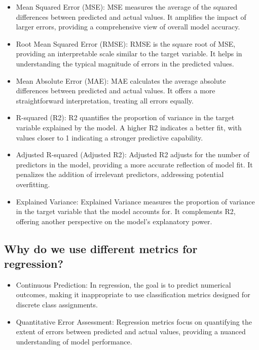 \begin{itemize}
\item Mean Squared Error (MSE):
\newline 
MSE measures the average of the squared differences between predicted and actual values. It amplifies the impact of larger errors, providing a comprehensive view of overall model accuracy.
\item Root Mean Squared Error (RMSE):
\newline 
RMSE is the square root of MSE, providing an interpretable scale similar to the target variable. It helps in understanding the typical magnitude of errors in the predicted values.
\item Mean Absolute Error (MAE):
\newline 
MAE calculates the average absolute differences between predicted and actual values. It offers a more straightforward interpretation, treating all errors equally.
\item R-squared (R2):
\newline 
R2 quantifies the proportion of variance in the target variable explained by the model. A higher R2 indicates a better fit, with values closer to 1 indicating a stronger predictive capability.
\item Adjusted R-squared (Adjusted R2):
\newline 
Adjusted R2 adjusts for the number of predictors in the model, providing a more accurate reflection of model fit. It penalizes the addition of irrelevant predictors, addressing potential overfitting.
\item Explained Variance:
Explained Variance measures the proportion of variance in the target variable that the model accounts for. It complements R2, offering another perspective on the model's explanatory power.

\end{itemize}

\subsection{Why do we use different metrics for regression?}
\begin{itemize}

\item Continuous Prediction:
\newline
In regression, the goal is to predict numerical outcomes, making it inappropriate to use classification metrics designed for discrete class assignments.
\item
Quantitative Error Assessment:
\newline 
Regression metrics focus on quantifying the extent of errors between predicted and actual values, providing a nuanced understanding of model performance.

\end{itemize}


